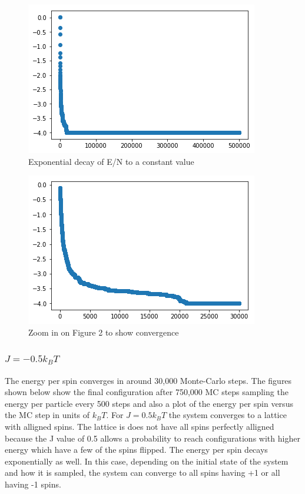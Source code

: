 \documentclass{article}
\begin{document}
	\begin{figure}[H]
		\centering
		\includegraphics[scale=0.75]{J=-2b}
		\caption{Exponential decay of E/N to a constant value}
	\end{figure}

	\begin{figure}[H]
		\centering
		\includegraphics[scale=0.75]{J=-2c}
		\caption{Zoom in on Figure 2 to show convergence}
	\end{figure}

	\subsubsection*{$J = -0.5k_BT$}

	The energy per spin converges in around 30,000 Monte-Carlo steps. The figures shown below show the final configuration after 750,000 MC steps sampling the energy per particle every 500 steps and also a plot of the energy per spin versus the MC step in units of $k_BT$. For $J=0.5k_BT$ the system converges to a lattice with alligned spins. The lattice is does not have all spins perfectly alligned because the J value of 0.5 allows a probability to reach configurations with higher energy which have a few of the spins flipped. The energy per spin decays exponentially as well. In this case, depending on the initial state of the system and how it is sampled, the system can converge to all spins having +1 or all having -1 spins. 
\end{document}
